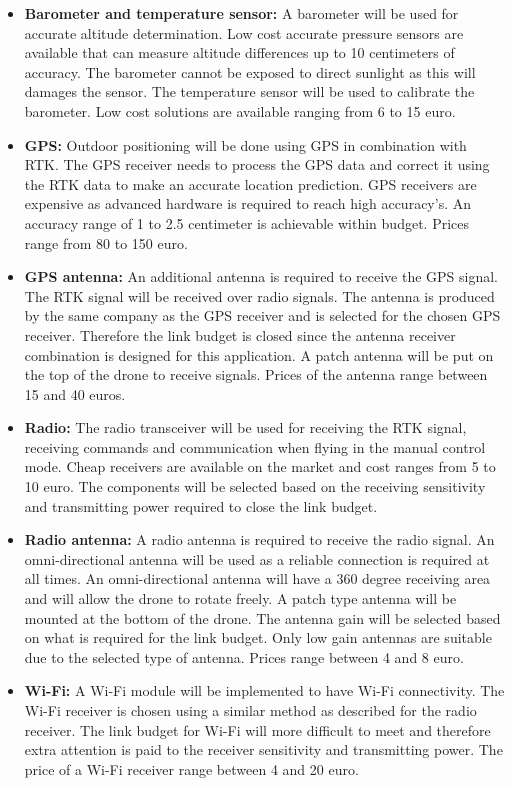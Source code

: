 \begin{itemize}[noitemsep,nolistsep]
    \item \textbf{Barometer and temperature sensor:} A barometer will be used for accurate altitude determination. Low cost accurate pressure sensors are available that can measure altitude differences up to 10 centimeters of accuracy. The barometer cannot be exposed to direct sunlight as this will damages the sensor. The temperature sensor will be used to calibrate the barometer. Low cost solutions are available ranging from 6 to 15 euro.
    \item \textbf{GPS:} Outdoor positioning will be done using GPS in combination with RTK. The GPS receiver needs to process the GPS data and correct it using the RTK data to make an accurate location prediction. GPS receivers are expensive as advanced hardware is required to reach high accuracy's. An accuracy range of 1 to 2.5 centimeter is achievable within budget. Prices range from 80 to 150 euro.
    \item \textbf{GPS antenna:} An additional antenna is required to receive the GPS signal. The RTK signal will be received over radio signals. The antenna is produced by the same company as the GPS receiver and is selected for the chosen GPS receiver. Therefore the link budget is closed since the antenna receiver combination is designed for this application. A patch antenna will be put on the top of the drone to receive signals. Prices of the antenna range between 15 and 40 euros.
    \item \textbf{Radio:} The radio transceiver will be used for receiving the RTK signal, receiving commands and communication when flying in the manual control mode. Cheap receivers are available on the market and cost ranges from 5 to 10 euro. The components will be selected based on the receiving sensitivity and transmitting power required to close the link budget.
    \item \textbf{Radio antenna:} A radio antenna is required to receive the radio signal. An omni-directional antenna will be used as a reliable connection is required at all times. An omni-directional antenna will have a 360 degree receiving area and will allow the drone to rotate freely. A patch type antenna will be mounted at the bottom of the drone. The antenna gain will be selected based on what is required for the link budget. Only low gain antennas are suitable due to the selected type of antenna. Prices range between 4 and 8 euro.
    \item \textbf{Wi-Fi:} A Wi-Fi module will be implemented to have Wi-Fi connectivity. The Wi-Fi receiver is chosen using a similar method as described for the radio receiver. The link budget for Wi-Fi will more difficult to meet and therefore extra attention is paid to the receiver sensitivity and transmitting power. The price of a Wi-Fi receiver range between 4 and 20 euro.

\end{itemize}
